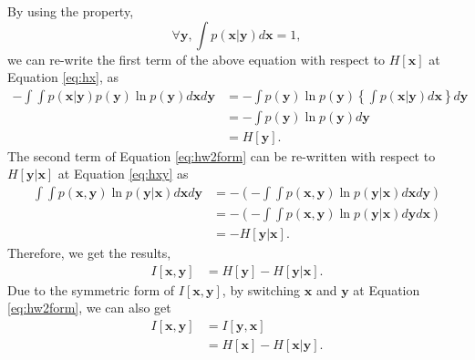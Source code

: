 \documentclass[journal,onecolumn,12pt]{IEEEtran}
\begin{document}
By using the property,
\begin{equation}
\forall \boldsymbol{y}, \int p(\boldsymbol{x}|\boldsymbol{y}) d\boldsymbol{x} = 1,
\end{equation}
we can re-write the first term of the above equation with respect to $H[\boldsymbol{x}]$ at Equation \ref{eq:hx}, as
\begin{equation}
\begin{aligned}
- \int \int {{p(\boldsymbol{x}|\boldsymbol{y})}{p(\boldsymbol{y})}} \ln p(\boldsymbol{y}) d\boldsymbol{x} d\boldsymbol{y}
 &= - \int {p(\boldsymbol{y})} \ln p(\boldsymbol{y}) \left\lbrace \int {p(\boldsymbol{x}|\boldsymbol{y})}d\boldsymbol{x} \right\rbrace d\boldsymbol{y}\\
 &= - \int {p(\boldsymbol{y})} \ln p(\boldsymbol{y}) d\boldsymbol{y}\\
 &= H[\boldsymbol{y}].
\end{aligned}
\end{equation}
The second term of Equation \ref{eq:hw2form} can be re-written with respect to $H[\boldsymbol{y}|\boldsymbol{x}]$ at Equation \ref{eq:hxy} as
\begin{equation}
\begin{aligned}
\int \int p(\boldsymbol{x},\boldsymbol{y})  \ln  {p(\boldsymbol{y}|\boldsymbol{x})} d\boldsymbol{x} d\boldsymbol{y} &= - \left( - \int \int p(\boldsymbol{x},\boldsymbol{y})  \ln  {p(\boldsymbol{y}|\boldsymbol{x})} d\boldsymbol{x} d\boldsymbol{y} \right)\\
&= - \left( - \int \int p(\boldsymbol{x},\boldsymbol{y})  \ln  {p(\boldsymbol{y}|\boldsymbol{x})} d\boldsymbol{y} d\boldsymbol{x} \right)\\
&= - H[\boldsymbol{y}|\boldsymbol{x}].
\end{aligned}
\end{equation}
Therefore, we get the results,
\begin{equation}
\begin{aligned}
I[\boldsymbol{x}, \boldsymbol{y}] &= H[\boldsymbol{y}] - H[\boldsymbol{y}|\boldsymbol{x}].
\end{aligned}
\end{equation}
Due to the symmetric form of $I[\boldsymbol{x},\boldsymbol{y}]$, by switching $\boldsymbol{x}$ and $\boldsymbol{y}$ at Equation \ref{eq:hw2form}, we can also get
\begin{equation}
\begin{aligned}
I[\boldsymbol{x}, \boldsymbol{y}] &= I[\boldsymbol{y}, \boldsymbol{x}] \\
&= H[\boldsymbol{x}] - H[\boldsymbol{x}|\boldsymbol{y}].
\end{aligned}
\end{equation}
\end{document}
